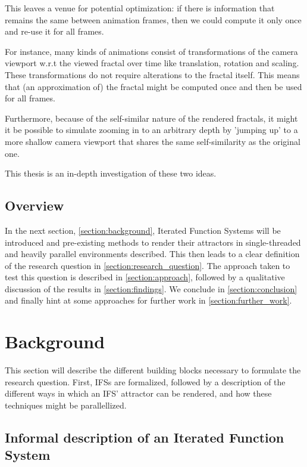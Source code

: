 \documentclass[11pt]{article}
\begin{document}
This leaves a venue for potential optimization: if there is information that remains the same between animation frames, 
then we could compute it only once and re-use it for all frames.

For instance, many kinds of animations consist of transformations of the camera viewport w.r.t the viewed fractal over time like translation, rotation and scaling. 
These transformations do not require alterations to the fractal itself.
This means that (an approximation of) the fractal might be computed once and then be used for all frames.

Furthermore, because of the self-similar nature of the rendered fractals,
it might it be possible to simulate zooming in to an arbitrary depth by 'jumping up' to a more shallow camera viewport
that shares the same self-similarity as the original one.

This thesis is an in-depth investigation of these two ideas.

\subsection{Overview}
\label{sec:org3b0cfb1}

In the next section, \autoref{section:background}, Iterated Function Systems will be introduced and pre-existing methods to render their attractors in single-threaded and heavily parallel environments described.
This then leads to a clear definition of the research question in \autoref{section:research_question}.
The approach taken to test this question is described in \autoref{section:approach}, followed by a qualitative discussion of the results in \autoref{section:findings}.
We conclude in \autoref{section:conclusion} and finally hint at some approaches for further work in \autoref{section:further_work}.

\section{Background}
\label{sec:orgec09bfb}
\label{section:background}

This section will describe the different building blocks necessary to formulate the research question.
First, IFSs are formalized, followed by a description of the different ways in which an IFS' attractor can be rendered, 
and how these techniques might be parallellized.

\subsection{Informal description of an Iterated Function System}
\label{sec:org72376eb}
\label{subsection:informal_description}
\end{document}
